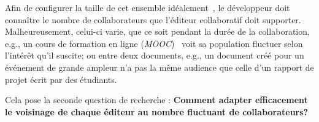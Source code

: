 Afin de configurer la taille de cet ensemble idéalement~\cite{erdos1959random},
le développeur doit connaître le nombre de collaborateurs que l'éditeur
collaboratif doit supporter. Malheureusement, celui-ci varie, que ce soit
pendant la durée de la collaboration, e.g., un cours de formation en ligne
(\emph{MOOC})~\cite{breslow2013studying} voit sa population fluctuer selon
l'intérêt qu'il suscite; ou entre deux documents, e.g., un document créé pour un
événement de grande ampleur n'a pas la même audience que celle d'un rapport de
projet écrit par des étudiants.

Cela pose la seconde question de recherche : \textbf{Comment adapter
  efficacement le voisinage de chaque éditeur au nombre fluctuant de
  collaborateurs?}




